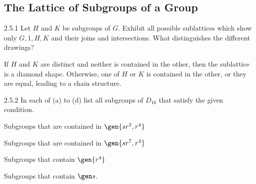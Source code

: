 \subsection{The Lattice of Subgroups of a Group}

\begin{exercise}{2.5.1}
    Let $H$ and $K$ be subgroups of $G$.
	Exhibit all possible sublattices which show only $G, 1, H, K$ and their joins and intersections.
	What distinguishes the different drawings?
\end{exercise}

\begin{sol}
    If $H$ and $K$ are distinct and neither is contained in the other, then the sublattice is a diamond shape.
	Otherwise, one of $H$ or $K$ is contained in the other, or they are equal, leading to a chain structure.
    \begin{center}
    \end{center}
\end{sol}

\begin{exercise}{2.5.2}
    In each of (a) to (d) list all subgroups of $D_{16}$ that satisfy the given condition.
    \begin{subexercises}
        \item Subgroups that are contained in $\gen{sr^2, r^4}$
        \item Subgroups that are contained in $\gen{sr^7, r^4}$
        \item Subgroups that contain $\gen{r^4}$
        \item Subgroups that contain $\gen s$.
    \end{subexercises}
\end{exercise}

